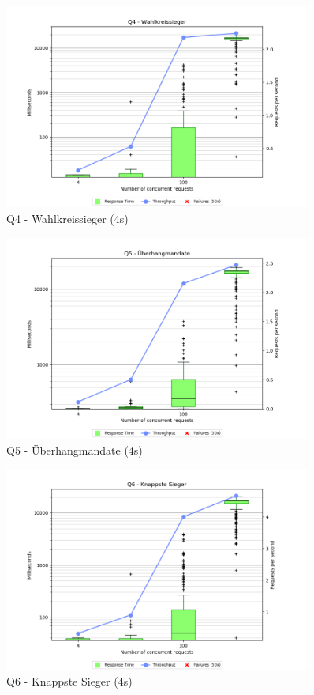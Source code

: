 \documentclass[a4paper]{scrreprt}
\begin{document}
\begin{figure}[htb!]
	\centering
	\includegraphics[width=0.9\textwidth]{images/plots_4s/Q4}
	\caption {Q4 - Wahlkreissieger (4s)}
\end{figure}

\begin{figure}[htb!]
	\centering
	\includegraphics[width=0.9\textwidth]{images/plots_4s/Q5}
	\caption {Q5 - Überhangmandate (4s)}
\end{figure}

\begin{figure}[htb!]
	\centering
	\includegraphics[width=0.9\textwidth]{images/plots_4s/Q6}
	\caption {Q6 - Knappste Sieger (4s)}
\end{figure}
\end{document}
